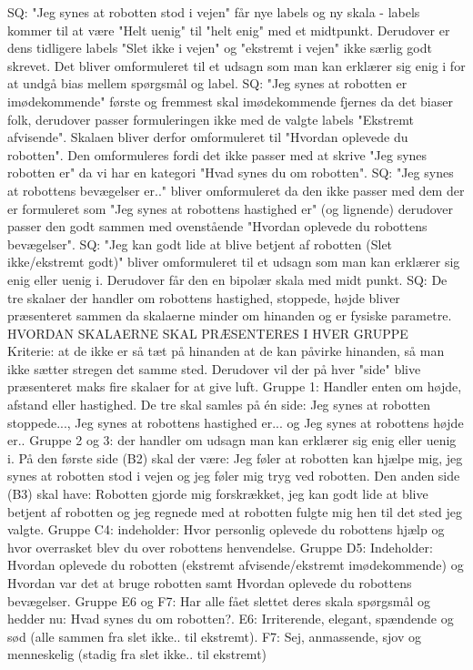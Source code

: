%
SQ: "Jeg synes at robotten stod i vejen" får nye labels og ny skala - labels kommer til at være "Helt uenig" til "helt enig" med et midtpunkt. Derudover er dens tidligere labels "Slet ikke i vejen" og "ekstremt i vejen" ikke særlig godt skrevet. Det bliver omformuleret til et udsagn som man kan erklærer sig enig i for at undgå bias mellem spørgsmål og label.\blankline
%
SQ: "Jeg synes at robotten er imødekommende" første og fremmest skal imødekommende fjernes da det biaser folk, derudover passer formuleringen ikke med de valgte labels "Ekstremt afvisende". Skalaen bliver derfor omformuleret til "Hvordan oplevede du robotten". Den omformuleres fordi det ikke passer med at skrive "Jeg synes robotten er" da vi har en kategori "Hvad synes du om robotten". \blankline
%
SQ: "Jeg synes at robottens bevægelser er.." bliver omformuleret da den ikke passer med dem der er formuleret som "Jeg synes at robottens hastighed er" (og lignende) derudover passer den godt sammen med ovenstående "Hvordan oplevede du robottens bevægelser".\blankline
%
SQ: "Jeg kan godt lide at blive betjent af robotten (Slet ikke/ekstremt godt)" bliver omformuleret til et udsagn som man kan erklærer sig enig eller uenig i. Derudover får den en bipolær skala med midt punkt. \blankline
%
SQ: De tre skalaer der handler om robottens hastighed, stoppede, højde bliver præsenteret sammen da skalaerne minder om hinanden og er fysiske parametre. \blankline
%
HVORDAN SKALAERNE SKAL PRÆSENTERES I HVER GRUPPE\\
Kriterie: at de ikke er så tæt på hinanden at de kan påvirke hinanden, så man ikke sætter stregen det samme sted. Derudover vil der på hver "side" blive præsenteret maks fire skalaer for at give luft.\blankline 
%
Gruppe 1: Handler enten om højde, afstand eller hastighed. De tre skal samles på én side: Jeg synes at robotten stoppede..., Jeg synes at robottens hastighed er... og Jeg synes at robottens højde er..\blankline
%
Gruppe 2 og 3: der handler om udsagn man kan erklærer sig enig eller uenig i. På den første side (B2) skal der være: Jeg føler at robotten kan hjælpe mig, jeg synes at robotten stod i vejen og jeg føler mig tryg ved robotten. Den anden side (B3) skal have: Robotten gjorde mig forskrækket, jeg kan godt lide at blive betjent af robotten og jeg regnede med at robotten fulgte mig hen til det sted jeg valgte. \blankline
%
Gruppe C4: indeholder: Hvor personlig oplevede du robottens hjælp og hvor overrasket blev du over robottens henvendelse.\blankline 
%
Gruppe D5: Indeholder: Hvordan oplevede du robotten (ekstremt afvisende/ekstremt imødekommende) og Hvordan var det at bruge robotten samt Hvordan oplevede du robottens bevægelser. \blankline
%
Gruppe E6 og F7: Har alle fået slettet deres skala spørgsmål og hedder nu: Hvad synes du om robotten?. E6: Irriterende, elegant, spændende og sød (alle sammen fra slet ikke.. til ekstremt). F7: Sej, anmassende, sjov og menneskelig (stadig fra slet ikke.. til ekstremt)



